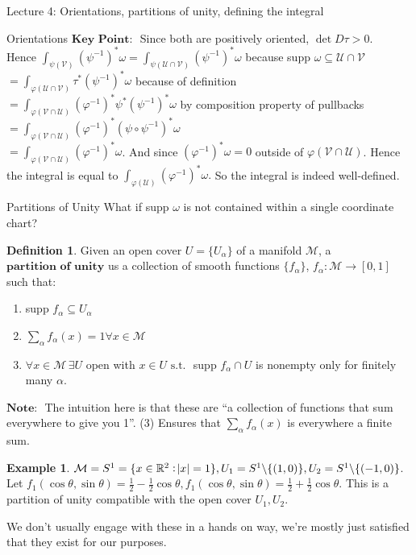\documentclass[10pt]{article}
\theoremstyle{plain}
\theoremstyle{definition}
\newtheorem{defn}[thm]{Definition} %
\newtheorem{exmp}[thm]{Example} %
\newcommand{\st}{\text{ s.t. }}
\newcommand{\Note}{\textbf{Note: }}
\newcommand{\KeyPoint}{\textbf{Key Point: }}
\newcommand{\Real}{\mathbb{R}}
\newcommand{\man}{\mathcal{M}}
\newcommand{\chartU}{\mathcal{U}}
\newcommand{\chartV}{\mathcal{V}}
\newcommand{\chart}{\varphi}
\newcommand{\xman}{x\in\man}
\newcommand{\sumfromto}[2]{\sum\limits_{#1}^{#2}}
\begin{document}
\begin{section}{Lecture 4: Orientations, partitions of unity, defining the integral}
\begin{subsection}{Orientations}
$\KeyPoint$ Since both are positively oriented, $\det D\tau > 0$.\\
Hence $\int_{\psi(\chartV)} (\psi^{-1})^*\omega = \int_{\psi(\chartU \cap\chartV)} (\psi^{-1})^*\omega$ because supp $\omega \subseteq\chartU\cap\chartV$\\
$ = \int_{\chart(\chartU \cap\chartV)} \tau^*(\psi^{-1})^*\omega$ because of definition\\
$= \int_{\chart(\chartV\cap\chartU)} (\chart^{-1})^*\psi^*(\psi^{-1})^*\omega$ by composition property of pullbacks\\
$= \int_{\chart(\chartV \cap\chartU)} (\chart^{-1})^*(\psi\circ\psi^{-1})^*\omega$\\
$=\int_{\chart(\chartV \cap\chartU)} (\chart^{-1})^*\omega$. And since $(\chart^{-1})^*\omega =0 $ outside of $\chart(\chartV\cap\chartU)$. Hence the integral is equal to $\int_{\chart(\chartU)}(\chart^{-1})^*\omega.$ So the integral is indeed well-defined.
\end{subsection}
 \begin{subsection}{Partitions of Unity}
 What if supp $\omega$ is not contained within a single coordinate chart? 
 \begin{defn}
 Given an open cover $U = \{U_\alpha\}$ of a manifold $\man$, a $\textbf{partition of unity}$ us a collection of smooth functions $\{f_\alpha\}$, $f_\alpha : \man \to [0,1]$ such that:
 \begin{enumerate}
     \item supp $f_\alpha \subseteq U_\alpha$
     \item $\sumfromto{\alpha}{}f_\alpha(x) = 1 \forall \xman$
     \item $\forall\xman\, \exists U$ open with $x\in U \st $ supp $f_\alpha \cap U$ is nonempty only for finitely many $\alpha$.
 \end{enumerate}
 \end{defn}
  $\Note $ The intuition here is that these are ``a collection of functions that sum everywhere to give you 1''. (3) Ensures that $\sumfromto{\alpha}{}f_\alpha(x)$ is everywhere a finite sum.
  \begin{exmp}
  $\man = S^1 = \{x\in\Real^2 : \abs{x} = 1 \}, U_1 = S^1\backslash\{(1,0)\}, U_2 = S^1\backslash\{(-1,0)\}$. Let $f_1(\cos\theta,\sin\theta) = \frac{1}{2} - \frac{1}{2} \cos \theta, f_1(\cos\theta,\sin\theta) = \frac{1}{2} + \frac{1}{2} \cos \theta$. This is a partition of unity compatible with the open cover $U_1,U_2.$
  \end{exmp}\noindent
  We don't usually engage with these in a hands on way, we're mostly just satisfied that they exist for our purposes.\\

\end{subsection}
\end{section}
\end{document}
